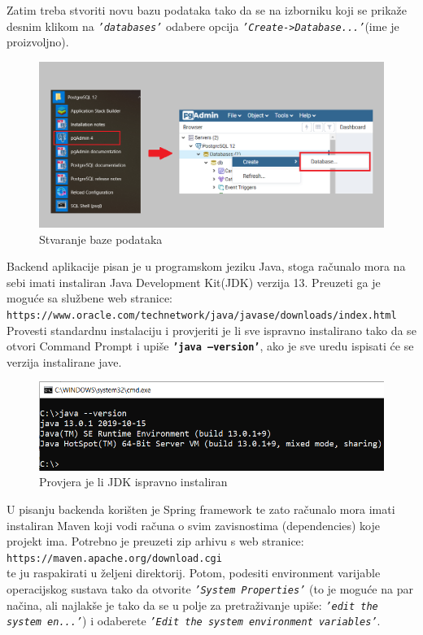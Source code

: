 		
			Zatim treba stvoriti novu bazu podataka tako da se na izborniku koji se prikaže desnim klikom na \texttt{\textit{'databases'}} odabere opcija \texttt{\textit{'Create->Database...'}}(ime je proizvoljno).
			
			\begin{figure}[h]
				\centering
				\includegraphics[scale=0.7]{slike/pustanjeupogon/a.png}
				\caption{Stvaranje baze podataka}
			\end{figure}
			
			Backend aplikacije pisan je u programskom jeziku Java, stoga računalo mora na sebi imati instaliran Java Development Kit(JDK) verzija 13. Preuzeti ga je moguće sa službene web stranice:
			\\
			\texttt{\small https://www.oracle.com/technetwork/java/javase/downloads/index.html}
			\\
			Provesti standardnu instalaciju i provjeriti je li sve ispravno instalirano tako da se otvori Command Prompt i upiše \textbf{\texttt{'java --version'}}, ako je sve uredu ispisati će se verzija instalirane jave.
			
			\begin{figure}[h]
				\centering
				\includegraphics[scale=0.6]{slike/pustanjeupogon/javaversion.png}
				\caption{Provjera je li JDK ispravno instaliran}
			\end{figure}

			U pisanju backenda korišten je Spring framework te zato računalo mora imati instaliran Maven koji vodi računa o svim zavisnostima (dependencies) koje projekt ima. Potrebno je preuzeti zip arhivu s web stranice:
			\\
			\texttt{\small https://maven.apache.org/download.cgi}
			\\
			te ju raspakirati u željeni direktorij. Potom, podesiti environment varijable operacijskog sustava tako da otvorite \texttt{\textit{'System Properties'}} (to je moguće na par načina, ali najlakše je tako da se u polje za pretraživanje upiše: \texttt{\textit{'edit the system en...'}}) i odaberete \texttt{\textit{'Edit the system environment variables'}}.
			
